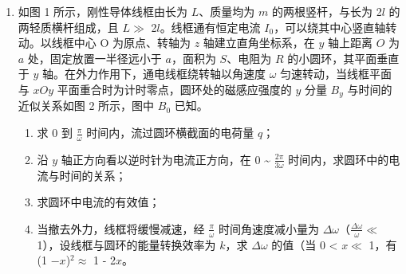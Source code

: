 \documentclass[\gkver]{gaokaozhenti}
\begin{document}
\begin{enumerate}
{ $mgh - 0.2mgL_{FG} = \frac{1}{2}mv^{2}$

解得  $v = 6 \, \Ums$

摆渡车碰到 IJ 前，滑块恰好不脱离摆渡车，说明滑块到达摆渡车右端时刚好与摆渡车共速  $v_{1}$，以滑块和摆渡车为系统，根据系统动量守恒可得

 $mv = 2mv_{1}$

解得  $v_{1}=\frac{v}{2}=3\Ums$

根据能量守恒可得

 $Q=\mu mgL=\frac{1}{2}mv^{2}-\frac{1}{2}\times2mv_{1}^{2}$

解得  $\mu = 0.3$

（3）滑块从滑上摆渡车到与摆渡车共速过程，滑块的加速度大小为

 $a=\frac{\mu mg}{m}=3\Umsq$

所用时间为

 $t_{1}=\frac{v-v_{1}}{a}=1\Us$

此过程滑块通过的位移为

 $x_{1}=\frac{v+v_{1}}{2}t_{1}=4.5\Um$

滑块与摆渡车共速后，滑块与摆渡车一起做匀速直线运动，该过程所用时间为
$$ t_{2}=\frac{L_{0}-x_{1}}{v_{1}}=1.5\Us $$

则滑块从 G 到 J 所用的时间为

 $t = t_{1} + t_{2} = 2.5\Us$
}

\item
如图 1 所示，刚性导体线框由长为 $L$、质量均为 $m$ 的两根竖杆，与长为 2$l$ 的两轻质横杆组成，且 $L \gg$ 2$l$。线框通有恒定电流 $I_{0}$，可以绕其中心竖直轴转动。以线框中心 O 为原点、转轴为 $z$ 轴建立直角坐标系，在 $y$ 轴上距离 $O$ 为 $a$ 处，固定放置一半径远小于 $a$，面积为 $S$、电阻为 $R$ 的小圆环，其平面垂直于 $y$ 轴。在外力作用下，通电线框绕转轴以角速度 $\omega$ 匀速转动，当线框平面与 $xOy$ 平面重合时为计时零点，圆环处的磁感应强度的 $y$ 分量 $B_{y}$ 与时间的近似关系如图 2 所示，图中 $B_{0}$ 已知。
\begin{enumerate}
	\item
	求 0 到 $\frac{\pi }{\omega }$ 时间内，流过圆环横截面的电荷量 $q$；
	\item
	沿 $y$ 轴正方向看以逆时针为电流正方向，在 0 \textasciitilde{} $\frac{{2\pi }}{{3\omega }}$ 时间内，求圆环中的电流与时间的关系；
	\item
	求圆环中电流的有效值；
	\item
	当撤去外力，线框将缓慢减速，经 $\frac{\pi }{\omega }$ 时间角速度减小量为 $\Delta\omega$（$\frac{{\Delta \omega }}{\omega } \ll$ 1），设线框与圆环的能量转换效率为 $k$，求 $\Delta\omega$ 的值（当 0 < $x \ll$ 1，有 (1 $- x$)$^{2} \approx$ 1 - 2$x$。
\end{enumerate}
\end{enumerate}
\end{document}
